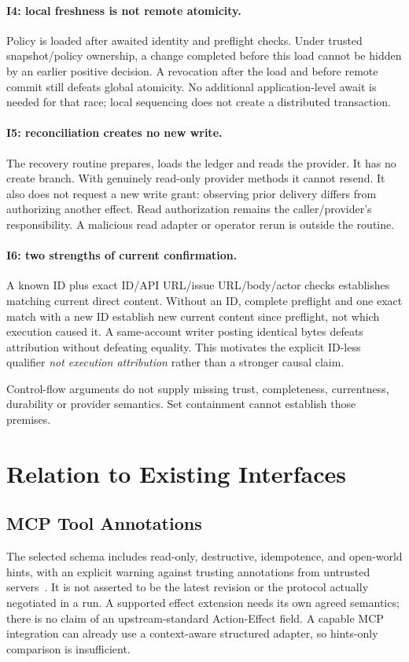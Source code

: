 \documentclass[11pt,letterpaper]{article}
\newcommand{\code}[1]{\texttt{\detokenize{#1}}}
\begin{document}
\paragraph{I4: local freshness is not remote atomicity.}
Policy is loaded after awaited identity and preflight checks. Under trusted
snapshot/policy ownership, a change completed before this load cannot be hidden
by an earlier positive decision. A revocation after the load and before remote
commit still defeats global atomicity. No additional application-level await is
needed for that race; local sequencing does not create a distributed transaction.

\paragraph{I5: reconciliation creates no new write.}
The recovery routine prepares, loads the ledger and reads the provider. It has
no create branch. With genuinely read-only provider methods it cannot resend.
It also does not request a new write grant: observing prior delivery differs
from authorizing another effect. Read authorization remains the caller/provider's
responsibility. A malicious read adapter or operator rerun is outside the routine.

\paragraph{I6: two strengths of current confirmation.}
A known ID plus exact ID/API URL/issue URL/body/actor checks establishes matching
current direct content. Without an ID, complete preflight and one exact match
with a new ID establish new current content since preflight, not which execution
caused it. A same-account writer posting identical bytes defeats attribution
without defeating equality. This motivates the explicit ID-less qualifier
\emph{not execution attribution} rather than a stronger causal claim.

Control-flow arguments do not supply missing trust, completeness, currentness,
durability or provider semantics. Set containment cannot establish those premises.

\section{Relation to Existing Interfaces}

\subsection{MCP Tool Annotations}
The selected \code{2025-11-25} schema includes read-only, destructive,
idempotence, and open-world hints, with an explicit warning against trusting
annotations from untrusted servers~\cite{mcp}. It is not asserted to be the
latest revision or the protocol actually negotiated in a run. A supported
effect extension needs its own agreed semantics; there is no claim of an
upstream-standard Action-Effect field. A capable MCP integration can already
use a context-aware structured adapter, so hints-only comparison is insufficient.
\end{document}
